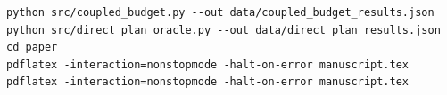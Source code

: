 \begin{lstlisting}
python src/coupled_budget.py --out data/coupled_budget_results.json
python src/direct_plan_oracle.py --out data/direct_plan_results.json
cd paper
pdflatex -interaction=nonstopmode -halt-on-error manuscript.tex
pdflatex -interaction=nonstopmode -halt-on-error manuscript.tex
\end{lstlisting}

